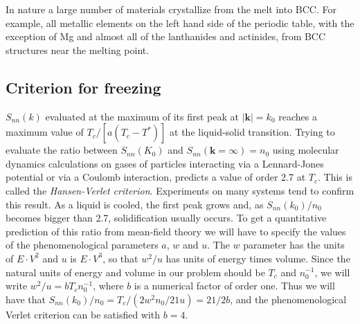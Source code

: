 \documentclass[12pt,a4paper]{article}
\begin{document}
In nature a large number of materials crystallize from the melt into BCC. For example, all metallic elements on the left hand side of the periodic table, with the exception of Mg and almost all of the lanthanides and actinides, from BCC structures near the melting point.

\subsection{Criterion for freezing}
$S_{nn}(k)$ evaluated at the maximum of its first peak at $|\textbf{k}|=k_0$ reaches a maximum value of $T_c/[a(T_c-T^*)]$ at the liquid-solid transition. Trying to evaluate the ratio between $S_{nn}(K_0)$ and $S_{nn}(\textbf{k}=\infty)=n_0$ using molecular dynamics calculations on gases of particles interacting via a Lennard-Jones potential or via a Coulomb interaction, predicts a value of order 2.7 at $T_c$. This is called the \textit{Hansen-Verlet criterion}. Experiments on many systems tend to confirm this result. As a liquid is cooled, the first peak grows and, as $S_{nn}(k_0)/n_0$ becomes bigger than 2.7, solidification usually occurs. To get a quantitative prediction of this ratio from mean-field theory we will have to specify the values of the phenomenological parameters $a$, $w$ and $u$. The $w$ parameter has the units of $E\cdot V^2$ and $u$ is $E \cdot V^3$, so that $w^2/u$ has units of energy times volume. Since the natural units of energy and volume in our problem should be $T_c$ and $n^{-1}_0$, we will write $w^2/u=bT_cn^{-1}_0$, where $b$ is a numerical factor of order one. Thus we will have that $S_{nn}(k_0)/n_0=T_c/(2w^2n_0/21u)=21/2b$, and the phenomenological Verlet criterion can be satisfied with $b=4$.
\end{document}
